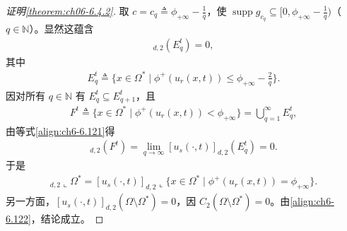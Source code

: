 \documentclass[../../main.tex]{subfiles}%
\begin{document}
\begin{proof}[证明\cref{theorem:ch06-6.4.2}]
取 $c=c_q\triangleq \phi_{+\infty}-\frac{1}{q}$，使 $\operatorname{supp}g_{c_q}\subseteq[0,\phi_{+\infty}-\frac{1}{q})$（$q\in\mathbb{N}$）。显然这蕴含
\begin{align}
[u_s(\cdot,t)]_{d,2}(E^t_q)=0, \label{align:ch6-6.121}
\end{align}
其中
\begin{align*}
E^t_q\triangleq \{x\in\Omega^*\mid\phi^+(u_r(x,t))\leqslant\phi_{+\infty}-\frac{2}{q}\}.
\end{align*}
因对所有 $q\in\mathbb{N}$ 有 $E^t_q\subseteq E^t_{q+1}$，且
\begin{align*}
F^t\triangleq \{x\in\Omega^*\mid\phi^+(u_r(x,t))<\phi_{+\infty}\}=\bigcup_{q=1}^\infty E^t_q,
\end{align*}
由等式\eqref{align:ch6-6.121}得
\begin{align*}
[u_s(\cdot,t)]_{d,2}(F^t)=\lim_{q\to\infty}[u_s(\cdot,t)]_{d,2}(E^t_q)=0.
\end{align*}
于是
\begin{align}
[u_s(\cdot,t)]_{d,2}\llcorner\Omega^*
=[u_s(\cdot,t)]_{d,2}\llcorner\{x\in\Omega^*\mid\phi^+(u_r(x,t))=\phi_{+\infty}\}. \label{align:ch6-6.122}
\end{align}
另一方面，$[u_s(\cdot,t)]_{d,2}(\Omega\setminus\Omega^*)=0$，因 $C_2(\Omega\setminus\Omega^*)=0$。由\eqref{align:ch6-6.122}，结论成立。
\end{proof}
\end{document}
